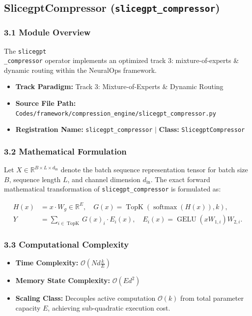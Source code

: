 \subsection{SlicegptCompressor (\texttt{slicegpt\_compressor})}
\label{sec:app_module_slicegpt_compressor}

\subsubsection*{3.1 Module Overview}
The \texttt{slicegpt\\_compressor} operator implements an optimized track 3: mixture-of-experts \& dynamic routing within the NeuralOps framework.
\begin{itemize}
    \item \textbf{Track Paradigm:} Track 3: Mixture-of-Experts & Dynamic Routing
    \item \textbf{Source File Path:} \texttt{Codes/framework/compression\_engine/slicegpt\_compressor.py}
    \item \textbf{Registration Name:} \texttt{slicegpt\_compressor} $\mid$ \textbf{Class:} \texttt{SlicegptCompressor}
\end{itemize}

\subsubsection*{3.2 Mathematical Formulation}
Let $X \in \mathbb{R}^{B \times L \times d_{\text{in}}}$ denote the batch sequence representation tensor for batch size $B$, sequence length $L$, and channel dimension $d_{\text{in}}$. The exact forward mathematical transformation of \texttt{slicegpt\_compressor} is formulated as:

\begin{align}
H(x) &= x \cdot W_g \in \mathbb{R}^{E}, \quad G(x) = \operatorname{TopK}\left(\operatorname{softmax}(H(x)), k\right), \\
Y &= \sum_{i \in \operatorname{TopK}} G(x)_i \cdot E_i(x), \quad E_i(x) = \operatorname{GELU}(x W_{1, i}) W_{2, i}.
\end{align}


\subsubsection*{3.3 Computational Complexity}
\begin{itemize}
    \item \textbf{Time Complexity:} $\mathcal{O}(N d \frac{k}{E})$
    \item \textbf{Memory State Complexity:} $\mathcal{O}(E d^2)$
    \item \textbf{Scaling Class:} Decouples active computation $\mathcal{O}(k)$ from total parameter capacity $E$, achieving sub-quadratic execution cost.
\end{itemize}

